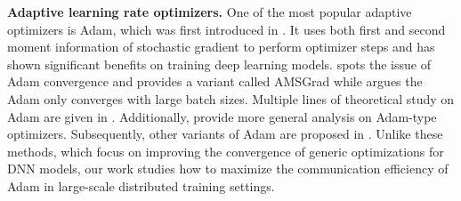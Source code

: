 \textbf{Adaptive learning rate optimizers.}
One of the most popular adaptive optimizers is Adam, which was first introduced in \citep{kingma2014adam}. It uses both first and second moment information of stochastic gradient to perform optimizer steps and has shown significant benefits on training deep learning models. \citet{reddi2019convergence} spots the issue of Adam convergence and provides a variant called AMSGrad while \citet{zaheer2018adaptive} argues the Adam only converges with large batch sizes.
Multiple lines of theoretical study on Adam are given in \citep{fang2019convergence,alacaoglu2020new,defossez2020simple}.
Additionally,
\citet{chen2018convergence,zhou2018convergence,lu2020mixml,danilova2020recent,zou2019sufficient} provide more general analysis on Adam-type optimizers.
Subsequently, other variants of Adam are proposed in \citep{luo2019adaptive,chen2019zo,huang2018nostalgic,wang2019sadam, zhou2018adashift, zhuang2021momentum,zhuang2020adabelief}. 
Unlike these methods, which focus on improving the convergence of generic optimizations for DNN models, our work studies how to maximize the communication efficiency of Adam in large-scale distributed training settings. 

